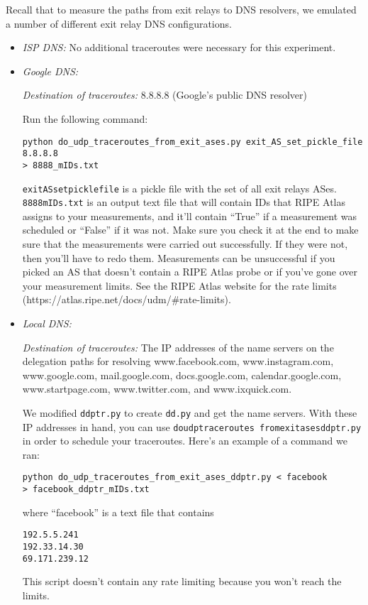 \documentclass{article}
\begin{document}
Recall that to measure the paths from exit relays to DNS resolvers, we 
emulated a number of different exit relay DNS configurations.
\begin{itemize}

\item \emph{ISP DNS:} No additional traceroutes were necessary for this experiment. 

\item \emph{Google DNS:} 

\emph{Destination of traceroutes:} 8.8.8.8 (Google's public DNS resolver)

Run the following command:
\begin{lstlisting}
python do_udp_traceroutes_from_exit_ases.py exit_AS_set_pickle_file 8.8.8.8 
> 8888_mIDs.txt
\end{lstlisting}
{\tt exit\textunderscore AS\textunderscore set\textunderscore pickle\textunderscore file} 
is a pickle file with the set of all exit relays ASes. 
{\tt 8888\textunderscore mIDs.txt} is an output text file that will contain IDs that RIPE Atlas 
assigns to your measurements, and it'll contain ``True'' if a measurement 
was scheduled or ``False'' if it was not. Make sure you check it at the end 
to make sure that the measurements were carried out successfully. If they were 
not, then you'll have to redo them. Measurements can be unsuccessful if you picked 
an AS that doesn't contain a RIPE Atlas probe or if you've gone over your 
measurement limits. See the RIPE Atlas website for the rate limits 
(https://atlas.ripe.net/docs/udm/\#rate-limits). 

\item \emph{Local DNS:}

\emph{Destination of traceroutes:} The IP addresses of the name servers on the delegation 
paths for resolving www.facebook.com, www.instagram.com, www.google.com, 
mail.google.com, docs.google.com, calendar.google.com, www.startpage.com, 
www.twitter.com, and www.ixquick.com. 

We modified {\tt ddptr.py} to create {\tt dd.py} and get 
the name servers. With these IP addresses in hand, you can use 
{\tt do\textunderscore udp\textunderscore traceroutes\textunderscore \textunderscore 
from\textunderscore exit\textunderscore ases\textunderscore ddptr.py} in order 
to schedule your traceroutes. Here's an example of a command we ran:
\begin{lstlisting}
python do_udp_traceroutes_from_exit_ases_ddptr.py < facebook
> facebook_ddptr_mIDs.txt
\end{lstlisting}
where ``facebook'' is a text file that contains
\begin{lstlisting}
192.5.5.241
192.33.14.30
69.171.239.12
\end{lstlisting}
This script doesn't contain any rate limiting because you won't reach the limits.


\end{itemize}
\end{document}
